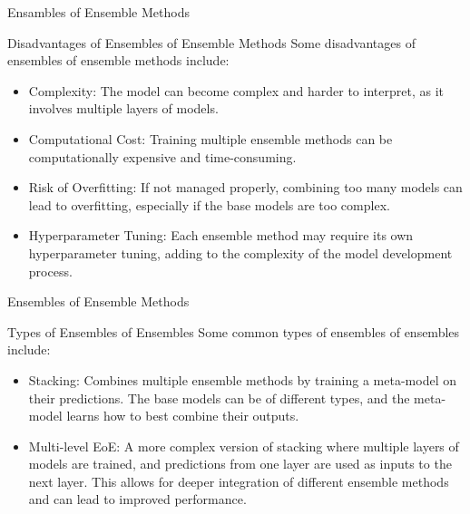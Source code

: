 \documentclass[hyperref={pdfpagelabels=false},aspectratio=169]{beamer}
\begin{document}
\begin{frame}[label={sec:org7ae870b}]{Ensambles of Ensemble Methods}
\begin{block}{Disadvantages of Ensembles of Ensemble Methods}
\pause
Some disadvantages of ensembles of ensemble methods include:
\begin{itemize}[<+->]
\item \alert{Complexity}: The model can become complex and harder to interpret, as it involves multiple layers of models.
\item \alert{Computational Cost}: Training multiple ensemble methods can be computationally expensive and time-consuming.
\item \alert{Risk of Overfitting}: If not managed properly, combining too many models can lead to overfitting, especially if the base models are too complex.
\item \alert{Hyperparameter Tuning}: Each ensemble method may require its own hyperparameter tuning, adding to the complexity of the model development process.
\end{itemize}
\end{block}
\end{frame}
\begin{frame}[label={sec:org21e11b4}]{Ensembles of Ensemble Methods}
\begin{block}{Types of Ensembles of Ensembles}
\pause
Some common types of ensembles of ensembles include:
\begin{itemize}[<+->]
\item \alert{Stacking}: Combines multiple ensemble methods by training a meta-model on their predictions. The base models can be of different types, and the meta-model learns how to best combine their outputs.
\item \alert{Multi-level EoE}: A more complex version of stacking where multiple layers of models are trained, and predictions from one layer are used as inputs to the next layer. This allows for deeper integration of different ensemble methods and can lead to improved performance.
\end{itemize}
\end{block}
\end{frame}
\end{document}
